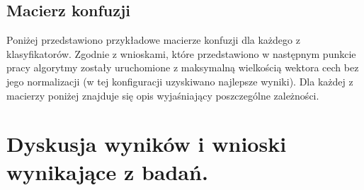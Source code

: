 \documentclass[12pt]{article}
\begin{document}
\subsection{Macierz konfuzji}
\indent Poniżej przedstawiono przykładowe macierze konfuzji dla każdego z klasyfikatorów. Zgodnie z wnioskami, które przedstawiono w następnym punkcie pracy algorytmy zostały uruchomione z maksymalną wielkością wektora cech bez jego normalizacji (w tej konfiguracji uzyskiwano najlepsze wyniki). Dla każdej z macierzy poniżej znajduje się opis wyjaśniający poszczególne zależności.





\section{Dyskusja wyników i wnioski wynikające z badań.}
\end{document}
